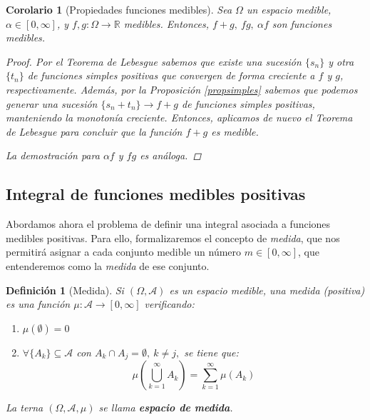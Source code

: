 \documentclass[11pt, a4paper]{article}
\theoremstyle{theorem-style}
\newtheorem{ncor}{Corolario}[section]
\theoremstyle{definition-style}
\newtheorem{ndef}{Definición}[section]
\theoremstyle{remark-style}
\theoremstyle{example-style}
\newenvironment{nlist}
{\begin{enumerate}
    \renewcommand\labelenumi{(\emph{\roman{enumi})}}}
  {\end{enumerate}}
\begin{document}
\begin{ncor}[Propiedades funciones medibles] Sea $\Omega$ un espacio medible, \mbox{$\alpha \in [0,\infty]$}, y $f,g : \Omega \to \mathbb{R}$ medibles. Entonces, $f + g, \ fg, \ \alpha f$ son funciones medibles.
  \begin{proof}
    Por el \textit{Teorema de Lebesgue} sabemos que existe una sucesión $\{s_n\}$ y otra $\{t_n\}$ de funciones simples positivas que convergen de forma creciente a $f$ y $g$, respectivamente. Además, por la \textit{Proposición \ref{propsimples}} sabemos que podemos generar una sucesión $\{s_n+t_n\} \to f+g$ de funciones simples positivas, manteniendo la monotonía creciente. Entonces, aplicamos de nuevo el \textit{Teorema de Lebesgue} para concluir que la función $f+g$ es medible.
    
    La demostración para $ \alpha f$ y $fg$ es análoga.
  \end{proof}
\end{ncor}



\subsection{Integral de funciones medibles positivas}

Abordamos ahora el problema de definir una integral asociada a funciones medibles positivas. Para ello, formalizaremos el concepto de \textit{medida}, que nos permitirá asignar a cada conjunto medible un número $m \in [0,\infty]$, que entenderemos como la \textit{medida} de ese conjunto. 

\begin{ndef}[Medida]
  Si $(\Omega, \mathcal A)$ es un espacio medible, una medida (positiva) es una función $\mu: \mathcal A \rightarrow [0, \infty]$ verificando:
  \begin{nlist}
  \item $\mu(\emptyset) = 0$
  \item $\forall \{A_k\} \subseteq \mathcal A$ con $A_k\cap A_j = \emptyset,\ k \neq j,$ se tiene que:
    $$\mu \left( \bigcup_{k=1}^\infty A_k \right) = \sum_{k=1}^\infty \mu(A_k) $$
  \end{nlist}
  La terna $(\Omega, \mathcal A, \mu)$ se llama \textbf{espacio de medida}.
\end{ndef}
\end{document}
